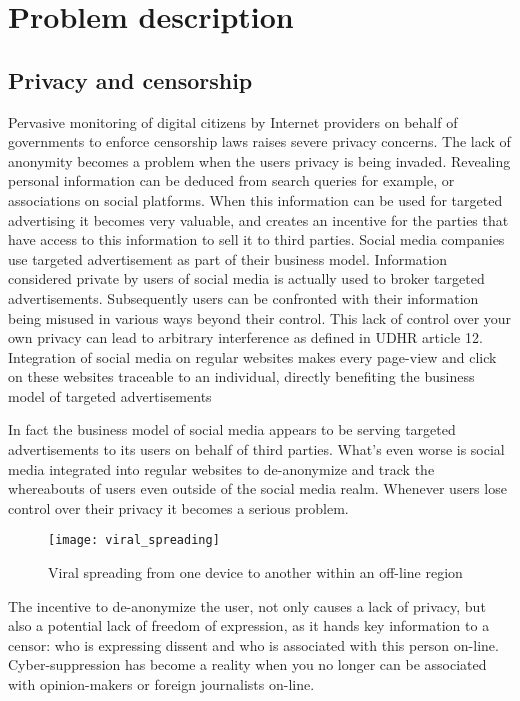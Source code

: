 \chapter{Problem description}\label{ch:problem_desc}

\section{Privacy and censorship}
Pervasive monitoring of digital citizens by Internet providers on behalf of governments to enforce censorship laws raises severe privacy concerns.
The lack of anonymity becomes a problem when the users privacy is being invaded.
Revealing personal information can be deduced from search queries for example, or associations on social platforms.
When this information can be used for targeted advertising it becomes very valuable, and creates an incentive for the parties that have access to this information to sell it to third parties.
Social media companies use targeted advertisement as part of their business model.
Information considered private by users of social media is actually used to broker targeted advertisements.
Subsequently users can be confronted with their information being misused in various ways beyond their control.
This lack of control over your own privacy can lead to arbitrary interference as defined in UDHR article 12. %
Integration of social media on regular websites makes every page-view and click on these websites traceable to an individual, directly benefiting the business model of targeted advertisements

In fact the business model of social media appears to be serving targeted advertisements to its users on behalf of third parties.
What's even worse is social media integrated into regular websites to de-anonymize and track the whereabouts of users even outside of the social media realm.
Whenever users lose control over their privacy it becomes a serious problem.

\begin{figure}[h]
	\centering
	\texttt{[image: viral\_spreading]}
	\caption{Viral spreading from one device to another within an off-line region}
	\label{fig:viral_spreading}
\end{figure}

The incentive to de-anonymize the user, not only causes a lack of privacy, but also a potential lack of freedom of expression, as it hands key information to a censor: who is expressing dissent and who is associated with this person on-line.
Cyber-suppression has become a reality when you no longer can be associated with opinion-makers or foreign journalists on-line.

